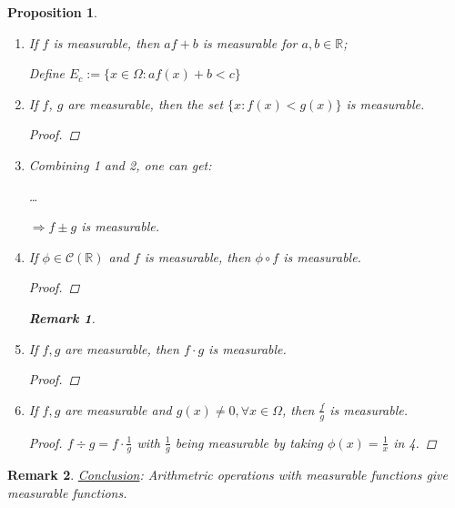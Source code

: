 \documentclass[12pt]{article}
\theoremstyle{blueplain}
\newtheorem{proposition}[theorem]{Proposition}
\theoremstyle{bluedef}
\theoremstyle{blueremark}
\newtheorem{remark}{Remark}[section]
\newcommand{\R}{\mathbb{R}}
\numberwithin{equation}{section}
\begin{document}
\begin{proposition}
  \begin{enumerate}
    \item If $f$ is measurable, then $a f + b$ is measurable for $a, b \in \R$;

          \noindent\medskip Define $E_c := \{x \in \Omega: af(x)+b<c\}$







    \item If $f$, $g$ are measurable, then the set $\{x: f(x)<g(x)\}$ is measurable.
          \begin{proof}

          \end{proof}

    \item Combining \textit{1} and \textit{2}, one can get:

          \ldots

          $\Rightarrow f \pm g$ is measurable.

    \item If $\phi \in \mathcal{C}(\R)$ and $f$ is measurable, then $\phi \circ f$ is measurable.
          \begin{proof}

          \end{proof}

          \begin{remark}

          \end{remark}

    \item If $f,g$ are measurable, then $f \cdot g$ is measurable.
          \begin{proof}

          \end{proof}

    \item If $f,g$ are measurable and $g(x) \neq 0, \forall x \in \Omega$, then $\frac{f}{g}$ is measurable.
          \begin{proof}
            $f \div g = f \cdot \frac{1}{g}$ with $\frac{1}{g}$ being measurable by taking $\phi (x) = \frac{1}{x}$ in \textit{4}.
          \end{proof}
  \end{enumerate}
\end{proposition}

\begin{remark}
  \underline{Conclusion}: Arithmetric operations with measurable functions give measurable functions.
\end{remark}
\end{document}
